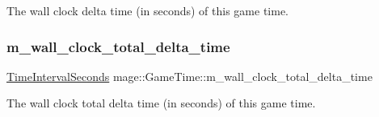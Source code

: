 The wall clock delta time (in seconds) of this game time. \mbox{\label{classmage_1_1_game_time_ac02186547dc6d0568df991b9de95d489}} 
\subsubsection{\texorpdfstring{m\+\_\+wall\+\_\+clock\+\_\+total\+\_\+delta\+\_\+time}{m\_wall\_clock\_total\_delta\_time}}
{\footnotesize\ttfamily \mbox{\hyperlink{namespacemage_a21c3d1575018d1e0720948713c76be1f}{Time\+Interval\+Seconds}} mage\+::\+Game\+Time\+::m\+\_\+wall\+\_\+clock\+\_\+total\+\_\+delta\+\_\+time\hspace{0.3cm}{\ttfamily [private]}}

The wall clock total delta time (in seconds) of this game time. 